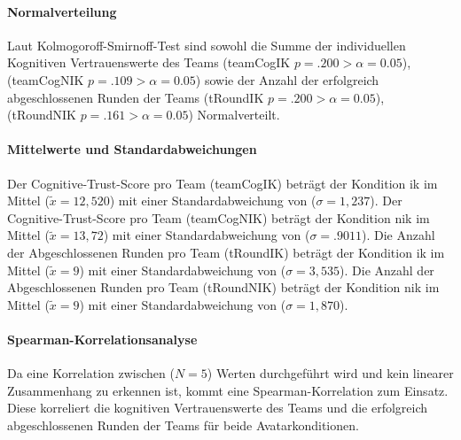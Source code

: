 \documentclass[a4paper,11pt]{article}%
\renewcommand{\\}{\vspace*{0.5\baselineskip} \newline}
\begin{document}
\paragraph{Normalverteilung}
Laut Kolmogoroff-Smirnoff-Test sind sowohl die Summe der individuellen Kognitiven Vertrauenswerte des Teams (\ac{teamCogIK} $p = .200 > \alpha = 0.05$), (\ac{teamCogNIK} $p = .109 > \alpha = 0.05$) sowie der Anzahl der erfolgreich abgeschlossenen Runden der Teams (\ac{tRoundIK} $p = .200 > \alpha = 0.05$), (\ac{tRoundNIK} $p = .161 > \alpha = 0.05$) Normalverteilt.

\paragraph{Mittelwerte und Standardabweichungen}
Der Cognitive-Trust-Score pro Team (\ac{teamCogIK}) beträgt der Kondition \ac{ik} im Mittel ($\tilde x = 12,520$) mit einer Standardabweichung von ($\sigma = 1,237$).\newline 
Der Cognitive-Trust-Score pro Team (\ac{teamCogNIK}) beträgt der Kondition \ac{nik} im Mittel ($\tilde x = 13,72$) mit einer Standardabweichung von ($\sigma = .9011$). \newline 
Die Anzahl der Abgeschlossenen Runden pro Team (\ac{tRoundIK}) beträgt der Kondition \ac{ik} im Mittel ($\tilde x = 9$) mit einer Standardabweichung von ($\sigma = 3,535$).\newline 
 Die Anzahl der Abgeschlossenen Runden pro Team (\ac{tRoundNIK}) beträgt der Kondition \ac{nik} im Mittel ($\tilde x = 9$) mit einer Standardabweichung von ($\sigma = 1,870$). 

\paragraph{Spearman-Korrelationsanalyse}
Da eine Korrelation zwischen ($N=5$) Werten durchgeführt wird und kein linearer Zusammenhang zu erkennen ist, kommt eine Spearman-Korrelation zum Einsatz. Diese korreliert die kognitiven Vertrauenswerte des Teams und die erfolgreich abgeschlossenen Runden der Teams für beide Avatarkonditionen.

\end{document}
